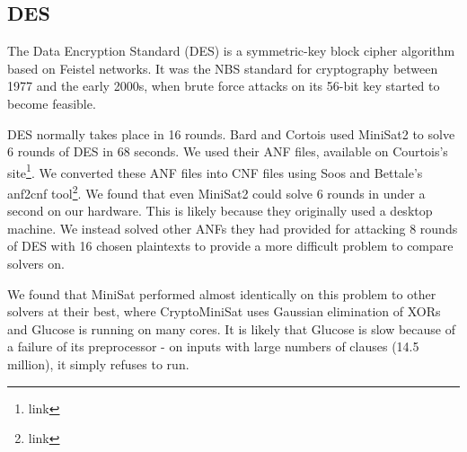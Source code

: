 \subsection{DES}
\label{sec:encoding:des}

The Data Encryption Standard (DES) is a symmetric-key block cipher algorithm based on Feistel networks. It was the NBS standard for cryptography between 1977 and the early 2000s, when brute force attacks on its 56-bit key started to become feasible.\cite{find appropriate citation}


DES normally takes place in 16 rounds. Bard and Cortois\cite{citation} used MiniSat2 to solve 6 rounds of DES in 68 seconds. We used their ANF files, available on Courtois's site\footnote{link}. We converted these ANF files into CNF files using Soos and Bettale's anf2cnf tool\footnote{link}. We found that even MiniSat2 could solve 6 rounds in under a second on our hardware. This is likely because they originally used a desktop machine. We instead solved other ANFs they had provided for attacking 8 rounds of DES with 16 chosen plaintexts to provide a more difficult problem to compare solvers on.

We found that MiniSat performed almost identically on this problem to other solvers at their best, where CryptoMiniSat uses Gaussian elimination of XORs and Glucose is running on many cores. It is likely that Glucose is slow because of a failure of its preprocessor - on inputs with large numbers of clauses (14.5 million), it simply refuses to run. 

